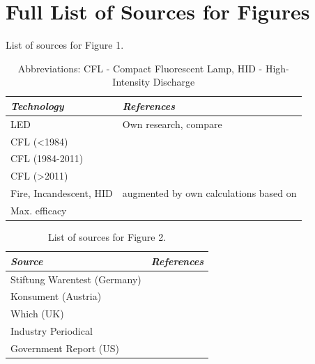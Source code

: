 \documentclass[parskip=full]{article}
\begin{document}
\begin{figure}[H]
\label{fig:phosphor_spectrum}
\end{figure}

\clearpage
\section{Full List of Sources for Figures}
\label{sec:sources}

\begin{table}[h!]
\captionsetup{justification=raggedright,singlelinecheck=false}
    \caption{List of sources for Figure 1.}
    \begin{NiceTabularX}{\textwidth}{|l|X|}
    \hline
    \textit{Technology} & \textit{References} \\
    \hline
    LED & Own research, compare \cite{zenodo_weinold_led_history} \\
    \hline
    CFL (<1984) & \cite{Bouwknegt1982}\cite{Vrenken1983} \\
    \hline
    CFL (1984-2011) & \cite{eger2018origin} \\
    \hline
    CFL (>2011) & \cite{Guan2015} \\
    \hline
    Fire, Incandescent, HID & \cite{azevedo2009transition} augmented by own calculations based on \cite{benesch1905beleuchtungswesen} \\
    \hline
    Max. efficacy & \cite{Murphy2012} \\
    \hline
    \end{NiceTabularX}
    \vspace{2mm}
    \caption*{Abbreviations: CFL - Compact Fluorescent Lamp, HID - High-Intensity Discharge}
\end{table}

\begin{table}[h!]
\captionsetup{justification=raggedright,singlelinecheck=false}
    \caption{List of sources for Figure 2.}
    \begin{NiceTabularX}{\textwidth}{|l|X|}
    \hline
    \textit{Source} & \textit{References} \\
    \hline
    Stiftung Warentest (Germany) & \cite{Warentest2008}\cite{Warentest2009_1}\cite{Warentest2009_2}\cite{Warentest2010_1}\cite{Warentest2010_2}\cite{Warentest2011}\cite{Warentest2012}\cite{Warentest2013}\cite{Warentest2014_1}\cite{Warentest2014_2}\cite{Warentest2015}\cite{Warentest2016_1}\cite{Warentest2016_2}\cite{Warentest2018} \\
    \hline
    Konsument (Austria) & \cite{Konsument2010} \\
    \hline
    Which (UK) & \cite{Which2020} \\
    \hline
    Industry Periodical & \cite{PM2020} \\
    \hline
    Government Report (US) & \cite{national2013assessment} \\
    \hline
    \end{NiceTabularX}
\end{table}
\end{document}
